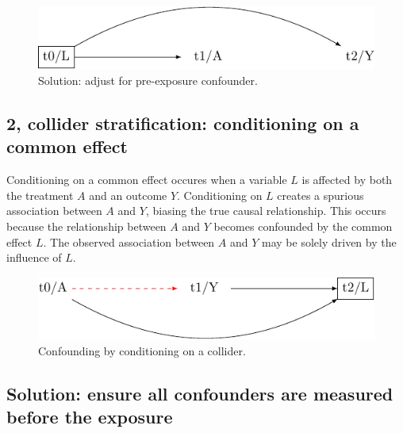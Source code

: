 \documentclass[
  singlecolumn]{report}
\begin{document}
\begin{figure}

{\centering \includegraphics[width=1\textwidth,height=\textheight]{causal-dags_files/figure-pdf/fig-dag-common-cause-solution-1.pdf}

}

\caption{\label{fig-dag-common-cause-solution}Solution: adjust for
pre-exposure confounder.}

\end{figure}

\hypertarget{collider-stratification-conditioning-on-a-common-effect}{%
\subsection{2, collider stratification: conditioning on a common
effect}\label{collider-stratification-conditioning-on-a-common-effect}}

Conditioning on a common effect occures when a variable \(L\) is
affected by both the treatment \(A\) and an outcome \(Y\). Conditioning
on \(L\) creates a spurious association between \(A\) and \(Y\), biasing
the true causal relationship. This occurs because the relationship
between \(A\) and \(Y\) becomes confounded by the common effect \(L\).
The observed association between \(A\) and \(Y\) may be solely driven by
the influence of \(L\).

\begin{figure}

{\centering \includegraphics[width=1\textwidth,height=\textheight]{causal-dags_files/figure-pdf/fig-dag-common-effect-1.pdf}

}

\caption{\label{fig-dag-common-effect}Confounding by conditioning on a
collider.}

\end{figure}

\hypertarget{solution-ensure-all-confounders-are-measured-before-the-exposure}{%
\subsection{Solution: ensure all confounders are measured before the
exposure}\label{solution-ensure-all-confounders-are-measured-before-the-exposure}}
\end{document}
